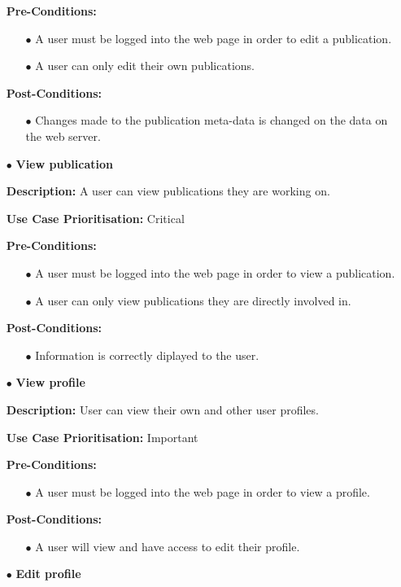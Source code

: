 \documentclass[a4paper,12pt]{article}
\begin{document}
\begin{itemize}
		\textbf{Pre-Conditions:}
		\begin{itemize}
			\item[$\bullet$]A user must be logged into the web page in order to edit a publication.
			\item[$\bullet$]A user can only edit their own publications.
			\\	
		\end{itemize}
		\textbf{Post-Conditions: }
		\begin{itemize}
			\item[$\bullet$]Changes made to the publication meta-data is changed on the data on the web server.
			\\
		\end{itemize}

		\newpage
		\item[$\bullet$]\textbf{View publication}\newline

		\textbf{Description:} A user can view publications they are working on.\newline
	
		\textbf{Use Case Prioritisation:} Critical\newline	

		\textbf{Pre-Conditions:}
		\begin{itemize}
			\item[$\bullet$]A user must be logged into the web page in order to view a publication.
			\item[$\bullet$]A user can only view publications they are directly involved in.
			\\
		\end{itemize}
		\textbf{Post-Conditions: }
		\begin{itemize}
			\item[$\bullet$]Information is correctly diplayed to the user.
			\\
		\end{itemize}
		\item[$\bullet$]\textbf{View profile}\newline

		\textbf{Description:} User can view their own and other user profiles.\newline
	
		\textbf{Use Case Prioritisation:} Important\newline

		\textbf{Pre-Conditions:}
		\begin{itemize}
			\item[$\bullet$]A user must be logged into the web page in order to view a profile.
			\\
		\end{itemize}
		\textbf{Post-Conditions: }
		\begin{itemize}
			\item[$\bullet$]A user will view and have access to edit their profile.
			\\
		\end{itemize}
		\item[$\bullet$]\textbf{Edit profile}\newline


\end{itemize}
\end{document}
